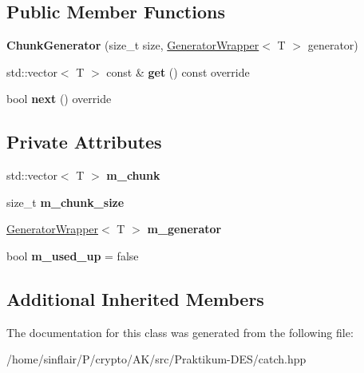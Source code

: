 \subsection*{Public Member Functions}
\begin{DoxyCompactItemize}
\item 
\mbox{\label{classCatch_1_1Generators_1_1ChunkGenerator_a50c334d00cde3166d71e9b90ebc2d2e3}} 
{\bfseries Chunk\+Generator} (size\+\_\+t size, \hyperlink{classCatch_1_1Generators_1_1GeneratorWrapper}{Generator\+Wrapper}$<$ T $>$ generator)
\item 
\mbox{\label{classCatch_1_1Generators_1_1ChunkGenerator_aa41c7d08a165b6a18560f2ab9e977f0b}} 
std\+::vector$<$ T $>$ const  \& {\bfseries get} () const override
\item 
\mbox{\label{classCatch_1_1Generators_1_1ChunkGenerator_a545e89f80eb1e3c953491541ea083f86}} 
bool {\bfseries next} () override
\end{DoxyCompactItemize}
\subsection*{Private Attributes}
\begin{DoxyCompactItemize}
\item 
\mbox{\label{classCatch_1_1Generators_1_1ChunkGenerator_ab5e382bc5be2e327331bd694a40fa827}} 
std\+::vector$<$ T $>$ {\bfseries m\+\_\+chunk}
\item 
\mbox{\label{classCatch_1_1Generators_1_1ChunkGenerator_a222b9cd460e6d48b12f939833b1b0beb}} 
size\+\_\+t {\bfseries m\+\_\+chunk\+\_\+size}
\item 
\mbox{\label{classCatch_1_1Generators_1_1ChunkGenerator_aa12b90ee9d029c44528fdba6b9de17bb}} 
\hyperlink{classCatch_1_1Generators_1_1GeneratorWrapper}{Generator\+Wrapper}$<$ T $>$ {\bfseries m\+\_\+generator}
\item 
\mbox{\label{classCatch_1_1Generators_1_1ChunkGenerator_a4a5f14d8f6c7a94e5771eb999c1ffe5a}} 
bool {\bfseries m\+\_\+used\+\_\+up} = false
\end{DoxyCompactItemize}
\subsection*{Additional Inherited Members}


The documentation for this class was generated from the following file\+:\begin{DoxyCompactItemize}
\item 
/home/sinflair/\+P/crypto/\+A\+K/src/\+Praktikum-\/\+D\+E\+S/catch.\+hpp\end{DoxyCompactItemize}

